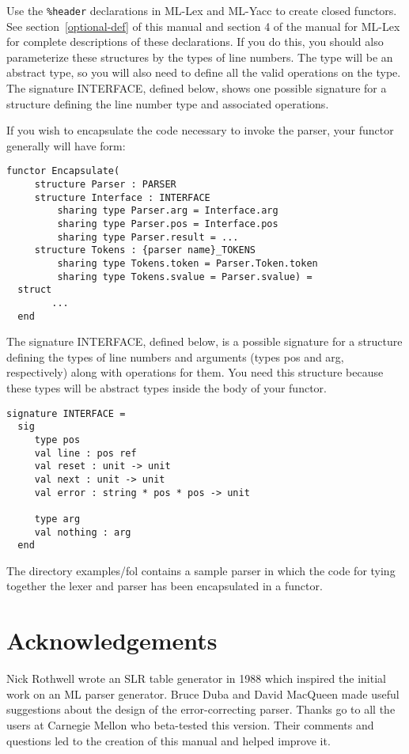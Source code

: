 \documentclass{article}
\begin{document}
Use the {\tt \%header} declarations in ML-Lex and ML-Yacc to create
closed functors.  See section~\ref{optional-def} of this manual
and section 4 of the manual for ML-Lex for complete descriptions of these
declarations.  If you do this, you should also parameterize these
structures by the types of line numbers.  The type will be an
abstract type, so you will also need to define all the valid
operations on the type.  The signature INTERFACE, defined below,
shows one possible signature for a structure defining the line
number type and associated operations.

If you wish to encapsulate the code necessary to invoke the
parser, your functor generally will have form:
\begin{tt}
\begin{verbatim}
functor Encapsulate(
     structure Parser : PARSER
     structure Interface : INTERFACE
         sharing type Parser.arg = Interface.arg
         sharing type Parser.pos = Interface.pos
         sharing type Parser.result = ...
     structure Tokens : {parser name}_TOKENS
         sharing type Tokens.token = Parser.Token.token
         sharing type Tokens.svalue = Parser.svalue) =
  struct
        ...
  end
\end{verbatim}
\end{tt}

The signature INTERFACE, defined below, is a possible signature for
a structure
defining the types
of line numbers and arguments (types pos and arg, respectively)
along with operations for them.  You need this structure
because
these types will be abstract types inside the body of your
functor.
\begin{tt}
\begin{verbatim}
signature INTERFACE = 
  sig
     type pos
     val line : pos ref
     val reset : unit -> unit
     val next : unit -> unit
     val error : string * pos * pos -> unit

     type arg
     val nothing : arg
  end
\end{verbatim}
\end{tt}

The directory examples/fol contains a sample parser in which
the code for tying together the lexer and parser has been
encapsulated in a functor.

\section{Acknowledgements}

Nick Rothwell wrote an SLR table generator in 1988 which inspired the
initial work on an ML parser generator.  Bruce Duba and David
MacQueen made useful suggestions about the design of the error-correcting
parser.  Thanks go to all the users at Carnegie Mellon who beta-tested
this version.  Their comments and questions led to the creation of
this manual and helped improve it.
\end{document}
